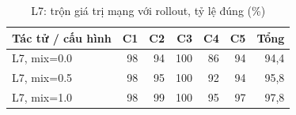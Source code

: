 \begin{table}[H]
  \centering
  \small
  \caption{L7: trộn giá trị mạng với rollout, tỷ lệ đúng (\%)}
  \label{tab:cs-ct-mix}
  \begin{tabular}{lrrrrrr}
    \toprule
    Tác tử / cấu hình & C1 & C2 & C3 & C4 & C5 & Tổng \\
    \midrule
    L7, mix=0.0 & 98 & 94 & 100 & 86 & 94 & 94,4 \\
    L7, mix=0.5 & 98 & 95 & 100 & 92 & 94 & 95,8 \\
    L7, mix=1.0 & 98 & 99 & 100 & 95 & 97 & 97,8 \\
    \bottomrule
  \end{tabular}
\end{table}
